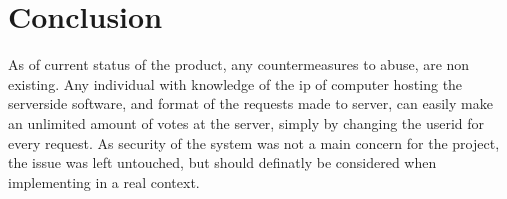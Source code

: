 \chapter{Conclusion}


As of current status of the product, any countermeasures to abuse, are non existing. Any individual with knowledge of the ip of computer hosting the serverside software, and format of the requests made to server, can easily make an unlimited amount of votes at the server, simply by changing the userid for every request. As security of the system was not a main concern for the project, the issue was left untouched, but should definatly be considered when implementing in a real context.    